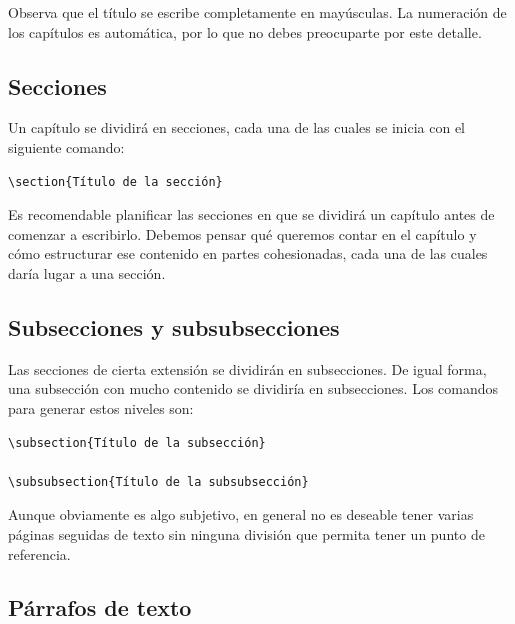 Observa que el título se escribe completamente en mayúsculas. La numeración de los capítulos es automática, por lo que no debes preocuparte por este detalle.

\subsection{Secciones}

Un capítulo se dividirá en secciones, cada una de las cuales se inicia con el siguiente comando:

\begin{verbatim}
\section{Título de la sección}
\end{verbatim}

Es recomendable planificar las secciones en que se dividirá un capítulo antes de comenzar a escribirlo. Debemos pensar qué queremos contar en el capítulo y cómo estructurar ese contenido en partes cohesionadas, cada una de las cuales daría lugar a una sección.

\subsection{Subsecciones y subsubsecciones}

Las secciones de cierta extensión se dividirán en subsecciones. De igual forma, una subsección con mucho contenido se dividiría en subsecciones. Los comandos para generar estos niveles son:

\begin{verbatim}
\subsection{Título de la subsección}

\subsubsection{Título de la subsubsección}
\end{verbatim}

Aunque obviamente es algo subjetivo, en general no es deseable tener varias páginas seguidas de texto sin ninguna división que permita tener un punto de referencia.

\subsection{Párrafos de texto}

